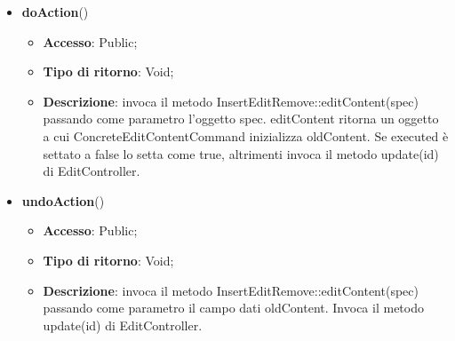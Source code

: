 {{{\begin{itemize}
\begin{itemize}
					\item \textbf{Accesso}: Public;
					\item \textbf{Tipo di ritorno}: Void;
					\item \textbf{Descrizione}: costruisce l’oggetto ConcreteEditContentCommand.
				\end{itemize}
				\item \textbf{doAction}()
				\begin{itemize}
					\item \textbf{Accesso}: Public;
					\item \textbf{Tipo di ritorno}: Void;
					\item \textbf{Descrizione}: invoca il metodo InsertEditRemove::editContent(spec) passando come parametro l'oggetto spec. editContent ritorna un oggetto a cui ConcreteEditContentCommand inizializza oldContent. Se executed è settato a false lo setta come true, altrimenti invoca il metodo update(id) di EditController.
				\end{itemize}
				\item \textbf{undoAction}()
				\begin{itemize}
					\item \textbf{Accesso}: Public;
					\item \textbf{Tipo di ritorno}: Void;
					\item \textbf{Descrizione}: invoca il metodo InsertEditRemove::editContent(spec) passando come parametro il campo dati oldContent. Invoca il metodo update(id) di EditController.
				\end{itemize}
			\end{itemize}
			}
}}
